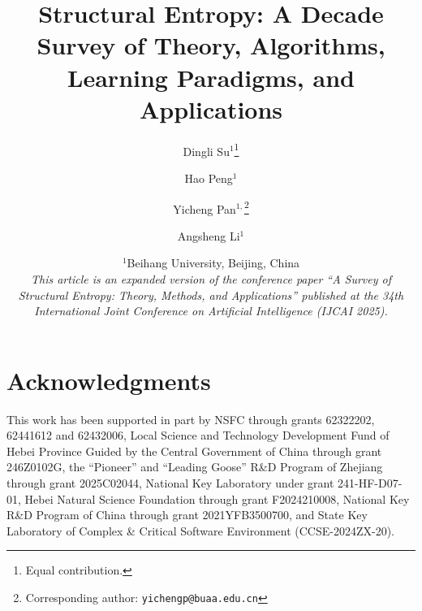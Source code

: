 \documentclass[12pt,a4paper]{article}
\title{%
  Structural Entropy: A Decade Survey of Theory, Algorithms,\\
  Learning Paradigms, and Applications
}
\author{%
  Dingli Su$^{1}$\thanks{Equal contribution.}
  \and
  Hao Peng$^{1}$
  \and
  Yicheng Pan$^{1,}$\thanks{Corresponding author: \texttt{yichengp@buaa.edu.cn}}
  \and
  Angsheng Li$^{1}$
}
\date{%
  $^1$Beihang University, Beijing, China\\[4pt]
  \small
  \emph{This article is an expanded version of the conference paper
  ``A Survey of Structural Entropy: Theory, Methods, and Applications''
  published at the 34th International Joint Conference on
  Artificial Intelligence (IJCAI 2025).}
}
\begin{document}
\maketitle
\thispagestyle{plain}










\section*{Acknowledgments}
This work has been supported in part by NSFC through grants 62322202, 62441612
and 62432006, Local Science and Technology Development Fund of Hebei Province
Guided by the Central Government of China through grant 246Z0102G, the
``Pioneer'' and ``Leading Goose'' R\&D Program of Zhejiang through grant
2025C02044, National Key Laboratory under grant 241-HF-D07-01, Hebei Natural
Science Foundation through grant F2024210008, National Key R\&D Program of China
through grant 2021YFB3500700, and State Key Laboratory of Complex \& Critical
Software Environment (CCSE-2024ZX-20).




\appendix

\end{document}
